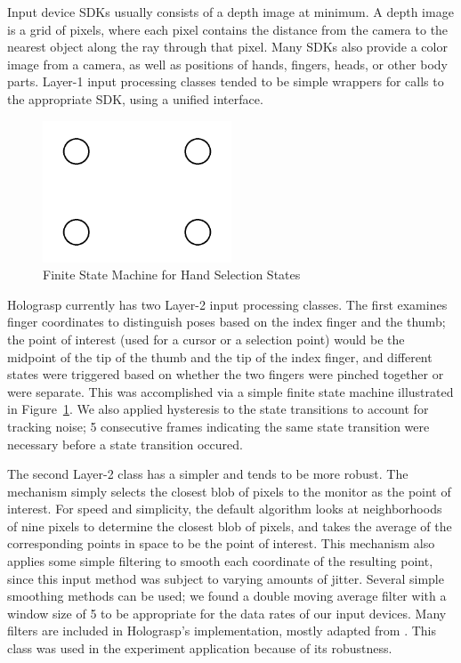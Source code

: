 \documentclass[pageno]{jpaper}
\begin{document}
Input device SDKs usually consists of a depth image at minimum. A depth image is a grid of pixels, where each 
pixel contains the distance from the camera to the nearest object along the ray through that pixel. Many SDKs
also provide a color image from a camera, as well as positions of hands, fingers, heads, or other body parts.
Layer-1 input processing classes tended to be simple wrappers for calls to the appropriate SDK, using a unified
interface.

\begin{figure}
\centering
\includegraphics[width=0.5\textwidth]{figures/fsm.png}
\caption{Finite State Machine for Hand Selection States}
\label{fig:fsm}
\end{figure}
Holograsp currently has two Layer-2 input processing classes. The first examines finger coordinates to distinguish poses based
on the index finger and the thumb; the point of interest (used for a cursor or a selection point) would be the midpoint of the tip
of the thumb and the tip of the index finger, and different states were triggered based on whether the two fingers were pinched
together or were separate. This was accomplished via a simple finite state machine illustrated in Figure~\ref{fig:fsm}. We also
applied hysteresis to the state transitions to account for tracking noise; 5 consecutive frames indicating the same state transition
were necessary before a state transition occured. 

The second Layer-2 class has a simpler and tends to be more robust. The mechanism simply selects the closest blob of pixels to the monitor
as the point of interest. For speed and simplicity, the default algorithm looks at neighborhoods of nine pixels to determine the closest blob of pixels,
and takes the average of the corresponding points in space to be the point of interest. This mechanism also applies some simple filtering to 
smooth each coordinate of the resulting point, since this input method was subject to varying amounts of jitter. Several simple 
smoothing methods can be used; we found a double moving average filter with a window size of 5 to be appropriate for the data rates of
our input devices. Many filters are included in Holograsp's implementation, mostly adapted from \cite{brown2004smoothing}. This class was
used in the experiment application because of its robustness.
\end{document}
